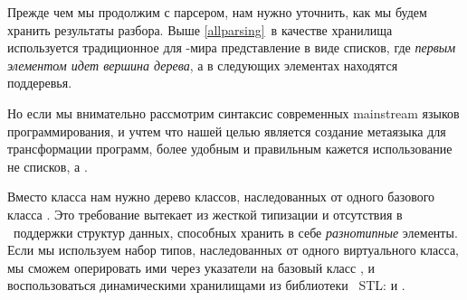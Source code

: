 
Прежде чем мы продолжим с парсером, нам нужно уточнить, как мы
будем хранить результаты разбора. Выше \ref{allparsing}\ в качестве хранилища
 используется традиционное для
\lisp-мира представление в виде списков, где \emph{первым элементом идет вершина
дерева}, а в следующих элементах находятся поддеревья.

Но если мы внимательно рассмотрим синтаксис современных main\-stream языков
программирования, и учтем что нашей
целью является создание метаязыка для трансформации программ, более
удобным и правильным кажется использование не списков, а .

Вместо класса  нам нужно дерево классов, наследованных от одного
 базового класса . Это требование вытекает из
жесткой типизации и отсутствия в \cpp\ поддержки  структур
данных, способных хранить в себе \emph{разнотипные} элементы. Если мы
используем набор типов, наследованных от одного виртуального класса, мы сможем оперировать ими
через указатели на базовый класс , и воспользоваться динамическими
хранилищами из библиотеки \cpp\ STL:  и
.


